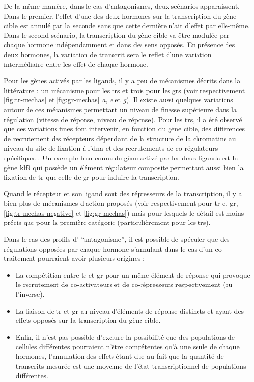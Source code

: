 \documentclass[../main.tex]{subfiles}
\begin{document}
	De la même manière, dans le cas d'antagonismes, deux scénarios apparaissent.
	Dans le premier, l'effet d'une des deux hormones sur la transcription du gène cible est annulé par la seconde sans que cette dernière n'ait d'effet par elle-même.
	Dans le second scénario, la transcription du gène cible va être modulée par chaque hormone indépendamment et dans des sens opposés.
	En présence des deux hormones, la variation de transcrit sera le reflet d'une variation intermédiaire entre les effet de chaque hormone.
	\par
	Pour les gènes activés par les ligands, il y a peu de mécanismes décrits dans la littérature :
	un mécanisme pour les \glspl{tr} et trois pour les \glspl{gr} (voir respectivement \autoref{fig:tr-mechas} et \autoref{fig:gr-mechas} \textit{a}, \textit{e} et \textit{g}).
	Il existe aussi quelques variations autour de ces mécanismes permettant un niveau de finesse supérieure dans la régulation (vitesse de réponse, niveau de réponse).
	Pour les \glspl{tr}, il a été observé que ces variations fines font intervenir, en fonction du gène cible, des différences de recrutement des récepteurs dépendant de la structure de la chromatine au niveau du site de fixation à l'\gls{dna} \citep{Bilesimo2011} et des recrutements de co-régulateurs spécifiques \citep{Havis2003}.
	Un exemple bien connu de gène activé par les deux ligands est le gène \gls{klf9} qui possède un élément régulateur composite permettant aussi bien la fixation de \gls{tr} que celle de \gls{gr} pour induire la transcription.
	\par
	Quand le récepteur et son ligand sont des répresseurs de la transcription, il y a bien plus de mécanismes d'action proposés (voir respectivement pour \gls{tr} et \gls{gr}, \autoref{fig:tr-mechas-negative} et \autoref{fig:gr-mechas}) mais pour lesquels le détail est moins précis que pour la première catégorie (particulièrement pour les \glspl{tr}).
	\par
	Dans le cas des profils d' ``antagonisme'', il est possible de spéculer que des régulations opposées par chaque hormone s'annulant dans le cas d'un co-traitement pourraient avoir plusieurs origines :
	\begin{itemize}
		\item
			La compétition entre \gls{tr} et \gls{gr} pour un même élément de réponse qui provoque le recrutement de co-activateurs et de co-répresseurs respectivement (ou l'inverse).
		\item
			La liaison de \gls{tr} et \gls{gr} au niveau d'éléments de réponse distincts et ayant des effets opposés sur la transcription du gène cible.
		\item
			Enfin, il n'est pas possible d'exclure la possibilité que des populations de cellules différentes pourraient n'être compétentes qu'à une seule de chaque hormones, l'annulation des effets étant due au fait que la quantité de transcrits mesurée est une moyenne de l'état transcriptionnel de populations différentes.
	\end{itemize}
\end{document}
